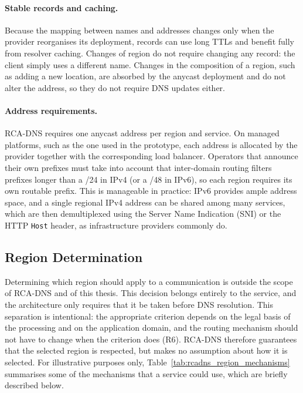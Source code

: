 \paragraph{Stable records and caching.} Because the mapping between names and addresses changes only when the provider reorganises its deployment, records can use long TTLs and benefit fully from resolver caching. Changes of region do not require changing any record: the client simply uses a different name. Changes in the composition of a region, such as adding a new location, are absorbed by the anycast deployment and do not alter the address, so they do not require DNS updates either.

\paragraph{Address requirements.} RCA-DNS requires one anycast address per region and service. On managed platforms, such as the one used in the prototype, each address is allocated by the provider together with the corresponding load balancer. Operators that announce their own prefixes must take into account that inter-domain routing filters prefixes longer than a /24 in IPv4 (or a /48 in IPv6), so each region requires its own routable prefix. This is manageable in practice: IPv6 provides ample address space, and a single regional IPv4 address can be shared among many services, which are then demultiplexed using the Server Name Indication (SNI) or the HTTP \texttt{Host} header, as infrastructure providers commonly do.

\subsection{Region Determination}
\label{sc:rcadns_region_determination}

Determining which region should apply to a communication is outside the scope of RCA-DNS and of this thesis. This decision belongs entirely to the service, and the architecture only requires that it be taken before DNS resolution. This separation is intentional: the appropriate criterion depends on the legal basis of the processing and on the application domain, and the routing mechanism should not have to change when the criterion does (R6). RCA-DNS therefore guarantees that the selected region is respected, but makes no assumption about how it is selected. For illustrative purposes only, Table~\ref{tab:rcadns_region_mechanisms} summarises some of the mechanisms that a service could use, which are briefly described below.

